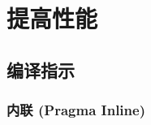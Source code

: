 %
%
%

\chapter{提高性能}

\section{编译指示}
\subsection{内联 (Pragma Inline)} %
\label{c:improv-perf:pragma:inline}
